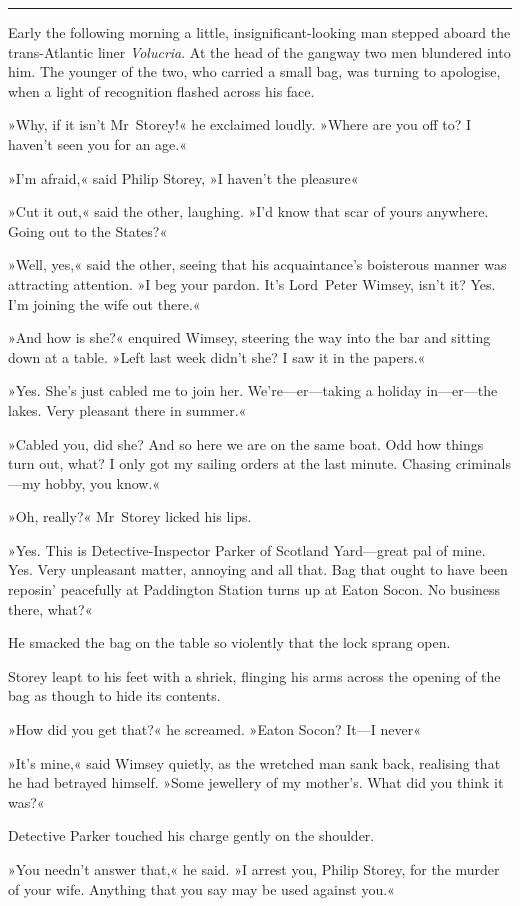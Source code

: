 \noindent\hfil\rule{0.5\textwidth}{.4pt}\hfil 

Early the following morning a little, insignificant-looking man stepped aboard the trans-Atlantic liner \textit{Volucria}. At the head of the gangway two men blundered into him. The younger of the two, who carried a small bag, was turning to apologise, when a light of recognition flashed across his face.

»Why, if it isn't Mr~Storey!« he exclaimed loudly. »Where are you off to? I haven't seen you for an age.«

»I'm afraid,« said Philip Storey, »I haven't the pleasure\longdash«

»Cut it out,« said the other, laughing. »I'd know that scar of yours anywhere. Going out to the States?«

»Well, yes,« said the other, seeing that his acquaintance's boisterous manner was attracting attention. »I beg your pardon. It's Lord~Peter Wimsey, isn't it? Yes. I'm joining the wife out there.«

»And how is she?« enquired Wimsey, steering the way into the bar and sitting down at a table. »Left last week didn't she? I saw it in the papers.«

»Yes. She's just cabled me to join her. We're—er—taking a holiday in—er—the lakes. Very pleasant there in summer.«

»Cabled you, did she? And so here we are on the same boat. Odd how things turn out, what? I only got my sailing orders at the last minute. Chasing criminals—my hobby, you know.«

»Oh, really?« Mr~Storey licked his lips.

»Yes. This is Detective-Inspector Parker of Scotland Yard—great pal of mine. Yes. Very unpleasant matter, annoying and all that. Bag that ought to have been reposin' peacefully at Paddington Station turns up at Eaton Socon. No business there, what?«

He smacked the bag on the table so violently that the lock sprang open.

Storey leapt to his feet with a shriek, flinging his arms across the opening of the bag as though to hide its contents.

»How did you get that?« he screamed. »Eaton Socon? It—I never\longdash«

»It's mine,« said Wimsey quietly, as the wretched man sank back, realising that he had betrayed himself. »Some jewellery of my mother's. What did you think it was?«

Detective Parker touched his charge gently on the shoulder.

»You needn't answer that,« he said. »I arrest you, Philip Storey, for the murder of your wife. Anything that you say may be used against you.«